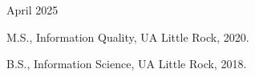 \begin{titlepage}
\begin{tabular}{ll}
\end{tabular}

\vspace{3em}

\begin{center}
April 2025

\vspace{1em}

\tamudepartment \par
\vspace{3em}
M.S., Information Quality, UA Little Rock, 2020.

B.S., Information Science, UA Little Rock, 2018.
\par\end{center}
\end{titlepage}
\pagebreak{}




